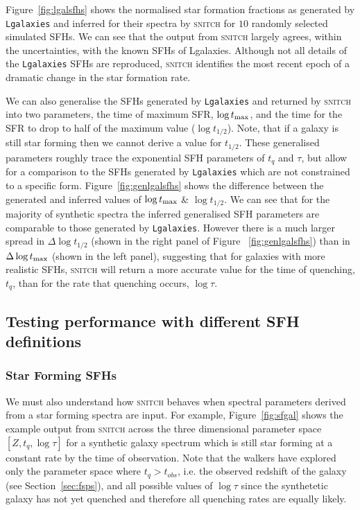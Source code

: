 \documentclass[useAMS,usenatbib]{mn2e}
\begin{document}
Figure~\ref{fig:lgalsfhs} shows the normalised star formation fractions as generated by \texttt{Lgalaxies} and inferred for their spectra by \textsc{snitch} for $10$ randomly selected simulated SFHs. We can see that the output from \textsc{snitch} largely agrees, within the uncertainties, with the known SFHs of Lgalaxies. Although not all details of the \texttt{Lgalaxies} SFHs are reproduced, \textsc{snitch} identifies the most recent epoch of a dramatic change in the star formation rate.

We can also generalise the SFHs generated by \texttt{Lgalaxies} and returned by \textsc{snitch} into two parameters, the time of maximum SFR, $\log t_{\rm{max}}$, and the time for the SFR to drop to half of the maximum value ($\log t_{1/2}$). Note, that if a galaxy is still star forming then we cannot derive a value for $t_{1/2}$. These generalised parameters roughly trace the exponential SFH parameters of $t_q$ and $\tau$, but allow for a comparison to the SFHs generated by \texttt{Lgalaxies} which are not constrained to a specific form. Figure~\ref{fig:genlgalsfhs} shows the difference between the generated and inferred values of $\log t_{\rm{max}}$ \& $\log t_{1/2}$. We can see that for the majority of synthetic spectra the inferred generalised SFH parameters are comparable to those generated by \texttt{Lgalaxies}. However there is a much larger spread in $\Delta \log t_{1/2}$ (shown in the right panel of Figure ~\ref{fig:genlgalsfhs}) than in $\Delta \log t_{\rm{max}}$ (shown in the left panel), suggesting that for galaxies with more realistic SFHs, \textsc{snitch} will return a more accurate value for the time of quenching, $t_q$, than for the rate that quenching occurs, $\log \tau$.



\subsection{Testing performance with different SFH definitions}\label{sec:diffSFHs}

\subsubsection{Star Forming SFHs}\label{secsec:starforming}

We must also understand how \textsc{snitch} behaves when spectral parameters derived from a star forming spectra are input. For example, Figure~\ref{fig:sfgal} shows the example output from \textsc{snitch} across the three dimensional parameter space $[Z,t_q,\log \tau]$ for a synthetic galaxy spectrum which is still star forming at a constant rate by the time of observation. Note that the walkers have explored only the parameter space where $t_q > t_{obs}$, i.e. the observed redshift of the galaxy (see Section~\ref{sec:fsps}), and all possible values of $\log \tau$ since the synthetetic galaxy has not yet quenched and therefore all quenching rates are equally likely.  
\end{document}
